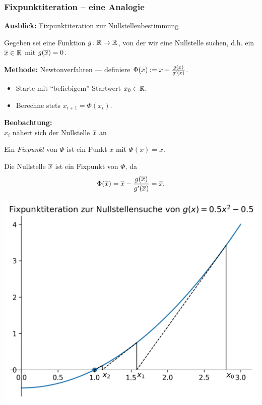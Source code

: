 \documentclass{beamer}
\begin{document}
\begin{frame} \frametitle{Fixpunktiteration -- eine Analogie}
	\small
	\textbf{Ausblick:} Fixpunktiteration zur Nullstellenbestimmung
	
	Gegeben sei eine Funktion $g \colon \mathbb{R} \to \mathbb{R}$, von der wir eine Nullstelle suchen, d.h. ein $\overline{x} \in \mathbb{R}$ mit $g(\overline{x}) = 0$.
	
	\pause
	\textbf{Methode:} Newtonverfahren --- definiere $\Phi(x) \mathrel{:=} x - \frac{g(x)}{g'(x)}$.
	\begin{itemize}
		\item Starte mit \enquote{beliebigem} Startwert $x_0 \in \mathbb{R}$.
		\item Berechne stets $x_{i+1} = \Phi(x_i)$.
	\end{itemize}

	\pause
	
	\begin{minipage}{\dimexpr0.6\linewidth-\fboxrule-\fboxsep}
		\textbf{Beobachtung:} \\
		$x_{i}$ nähert sich der Nullstelle $\overline{x}$ an
		
		\pause \smallskip
		Ein \textit{Fixpunkt} von $\Phi$ ist ein Punkt $x$ mit $\Phi(x) = x$.
		
		\pause \smallskip
		Die Nullstelle $\overline{x}$ ist ein Fixpunkt von $\Phi$, da
		\begin{equation*}
		\Phi(\overline{x}) = \overline{x} - \frac{g(\overline{x})}{g'(\overline{x})} = \overline{x} .
		\end{equation*} 
	\end{minipage}
	\pause
	\begin{minipage}{\dimexpr0.4\linewidth-\fboxrule-\fboxsep}
		\includegraphics[width=\linewidth]{tut03_fixpunktiteration.png}
	\end{minipage}
	
\end{frame}
\end{document}
